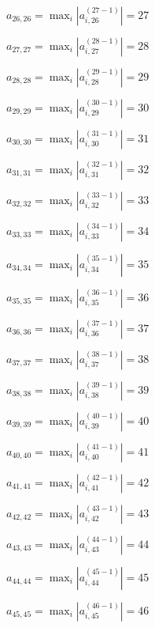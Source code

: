 \documentclass[a4paper,12pt]{article}
\begin{document}
$a _{ 26, 26 } =  \max _i |a _{ i, 26 } ^{ (27 - 1) } | = 27$

$a _{ 27, 27 } =  \max _i |a _{ i, 27 } ^{ (28 - 1) } | = 28$

$a _{ 28, 28 } =  \max _i |a _{ i, 28 } ^{ (29 - 1) } | = 29$

$a _{ 29, 29 } =  \max _i |a _{ i, 29 } ^{ (30 - 1) } | = 30$

$a _{ 30, 30 } =  \max _i |a _{ i, 30 } ^{ (31 - 1) } | = 31$

$a _{ 31, 31 } =  \max _i |a _{ i, 31 } ^{ (32 - 1) } | = 32$

$a _{ 32, 32 } =  \max _i |a _{ i, 32 } ^{ (33 - 1) } | = 33$

$a _{ 33, 33 } =  \max _i |a _{ i, 33 } ^{ (34 - 1) } | = 34$

$a _{ 34, 34 } =  \max _i |a _{ i, 34 } ^{ (35 - 1) } | = 35$

$a _{ 35, 35 } =  \max _i |a _{ i, 35 } ^{ (36 - 1) } | = 36$

$a _{ 36, 36 } =  \max _i |a _{ i, 36 } ^{ (37 - 1) } | = 37$

$a _{ 37, 37 } =  \max _i |a _{ i, 37 } ^{ (38 - 1) } | = 38$

$a _{ 38, 38 } =  \max _i |a _{ i, 38 } ^{ (39 - 1) } | = 39$

$a _{ 39, 39 } =  \max _i |a _{ i, 39 } ^{ (40 - 1) } | = 40$

$a _{ 40, 40 } =  \max _i |a _{ i, 40 } ^{ (41 - 1) } | = 41$

$a _{ 41, 41 } =  \max _i |a _{ i, 41 } ^{ (42 - 1) } | = 42$

$a _{ 42, 42 } =  \max _i |a _{ i, 42 } ^{ (43 - 1) } | = 43$

$a _{ 43, 43 } =  \max _i |a _{ i, 43 } ^{ (44 - 1) } | = 44$

$a _{ 44, 44 } =  \max _i |a _{ i, 44 } ^{ (45 - 1) } | = 45$

$a _{ 45, 45 } =  \max _i |a _{ i, 45 } ^{ (46 - 1) } | = 46$
\end{document}
